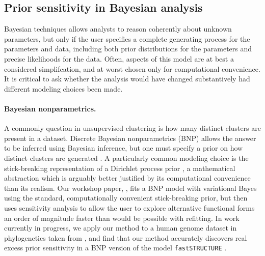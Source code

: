 \subsection*{Prior sensitivity in Bayesian analysis}

Bayesian techniques allows analysts to reason coherently about unknown
parameters, but only if the user specifies a complete generating process for the
parameters and data, including both prior distributions for the parameters and
precise likelihoods for the data.  Often, aspects of this model are at best a
considered simplifcation, and at worst chosen only for computational
convenience.  It is critical to ask whether the analysis would have changed
substantively had different modeling choices been made.

\paragraph{Bayesian nonparametrics.}

A commonly question in unsupervised clustering is how many distinct clusters are
present in a dataset.  Discrete Bayesian nonparametrics (BNP) allows the answer
to be inferred using Bayesian inference, but one must specify a prior on how
distinct clusters are generated \citep{ghosh:2003:bnp,
gershman:2012:bnptutorial}.  A particularly common modeling choice is the
stick-breaking representation of a Dirichlet process prior
\citep{sethuraman:1994:constructivedp}, a mathematical abstraction which is
arguably better justified by its computational convenience than its realism. Our
workshop paper, \citet{giordano:2018:bnpsensitivity}, fits a BNP model with
variational Bayes \citep{blei:2006:dirichletbnp} using the standard,
computationally convenient stick-breaking prior, but then uses sensitivity
analysis to allow the user to explore alternative functional forms an order of
magnitude faster than would be possible with refitting. In work currently in
progress, we apply our method to a human genome dataset in phylogenetics taken
from \citep{huang:2011:haplotype}, and find that our method accurately discovers
real excess prior sensitivity in a BNP version of the model
\texttt{fastSTRUCTURE} \citep{raj:2014:faststructure}.



